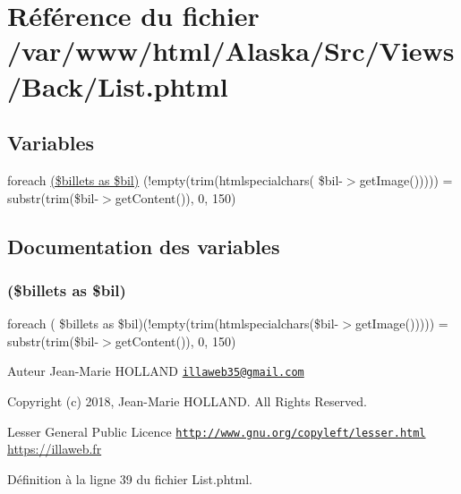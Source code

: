 \hypertarget{_back_2_list_8phtml}{}\section{Référence du fichier /var/www/html/\+Alaska/\+Src/\+Views/\+Back/\+List.phtml}
\label{_back_2_list_8phtml}
\subsection*{Variables}
\begin{DoxyCompactItemize}
\item 
foreach \hyperlink{_back_2_list_8phtml_ad2f3a7b0d156c4152b10073c2ddf4feb}{(\$billets as \$bil)} (!empty(trim(htmlspecialchars( \$bil-\/$>$get\+Image())))) = substr(trim(\$bil-\/$>$get\+Content()), 0, 150)
\end{DoxyCompactItemize}


\subsection{Documentation des variables}
\mbox{\label{_back_2_list_8phtml_ad2f3a7b0d156c4152b10073c2ddf4feb}} 
\subsubsection{\texorpdfstring{(\$billets as \$bil)}{($billets as $bil)}}
{\footnotesize\ttfamily foreach ( \$billets as \$bil)(!empty(trim(htmlspecialchars(\$bil-\/$>$get\+Image())))) = substr(trim(\$bil-\/$>$get\+Content()), 0, 150)}

\begin{DoxyAuthor}{Auteur}
Jean-\/\+Marie H\+O\+L\+L\+A\+ND \href{mailto:illaweb35@gmail.com}{\tt illaweb35@gmail.\+com} 
\end{DoxyAuthor}
\begin{DoxyCopyright}{Copyright}
(c) 2018, Jean-\/\+Marie H\+O\+L\+L\+A\+ND. All Rights Reserved.
\end{DoxyCopyright}
Lesser General Public Licence \href{http://www.gnu.org/copyleft/lesser.html}{\tt http\+://www.\+gnu.\+org/copyleft/lesser.\+html} \hyperlink{}{https\+://illaweb.\+fr}

Définition à la ligne 39 du fichier List.\+phtml.

